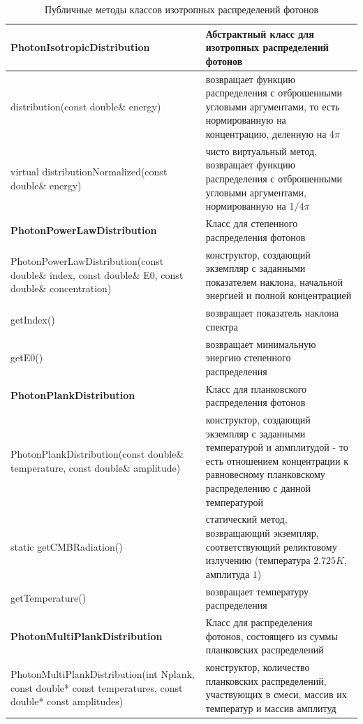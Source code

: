 \begin{table}
	\begin{center}
		\caption{Публичные методы классов изотропных распределений фотонов}
		\label{photonDistributionMethods}
		\begin{small}
			\begin{tabularx}{\textwidth}{|X|X|}
				\hline
				\textbf{PhotonIsotropicDistribution} & Абстрактный класс для изотропных распределений фотонов\\
				\hline
				distribution(const double\& energy) & возвращает функцию распределения с отброшенными угловыми аргументами, то есть нормированную на концентрацию, деленную на $4 \pi$ \\
				\hline
				virtual distributionNormalized(const double\& energy) & чисто виртуальный метод, возвращает функцию распределения с отброшенными угловыми аргументами, нормированную на  $ 1 / 4 \pi$\\
				\hline
				\textbf{PhotonPowerLawDistribution} & Класс для степенного распределения фотонов\\
				\hline
				PhotonPowerLawDistribution(const double\& index, const double\& E0, const double\& concentration) & конструктор, создающий экземпляр с заданными показателем наклона, начальной энергией и полной концентрацией \\
				\hline
				getIndex() & возвращает показатель наклона спектра\\
				\hline
				getE0() & возвращает минимальную энергию степенного распределения\\
				\hline
				\textbf{PhotonPlankDistribution} & Класс для планковского распределения фотонов\\
				\hline
				PhotonPlankDistribution(const double\& temperature, const double\& amplitude) & конструктор, создающий экземпляр с заданными температурой и апмплитудой - то есть отношением концентрации к равновесному планковскому распределению с данной температурой\\
				\hline
				static getCMBRadiation() & статический метод, возвращающий экземпляр, соответствующий реликтовому излучению (температура $2.725 K$, амплитуда $1$)\\
				\hline
				getTemperature() & возвращает температуру распределения\\
				\hline
				\textbf{PhotonMultiPlankDistribution} & Класс для распределения фотонов, состоящего из суммы планковских распределений\\
				\hline
				PhotonMultiPlankDistribution(int Nplank, const double* const temperatures, const double* const amplitudes) & конструктор, количество планковских распределений, участвующих в смеси, массив их температур и массив амплитуд\\

\end{tabularx}
\end{small}
\end{center}
\end{table}
